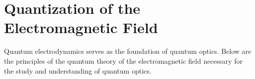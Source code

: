 \chapter{Quantization of the Electromagnetic Field} 
\label{chQuantel}

Quantum electrodynamics serves as the foundation of quantum optics. Below 
are the principles of the quantum theory of the electromagnetic field 
necessary for the study and understanding of quantum optics.

















